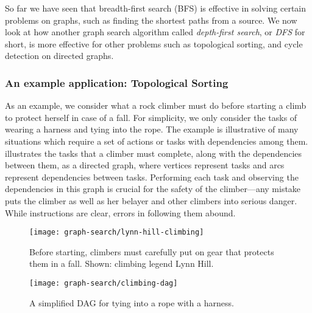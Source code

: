 \newcommand{\dfs}{\ttt{DFS}}

\newcommand{\newll}[1][]{
\ifthenelse{\equal{#1}{}}
{$\\ \makebox[\foo][r]{}$~\csep~}
{$\\ \makebox[\foo][r]{\clabel{#1}}$~\csep~}
}

So far we have seen that breadth-first search (BFS) is
effective in solving certain problems on graphs, such as finding the
shortest paths from a source.    We now look at how
another graph search algorithm called {\em depth-first search}, or
{\em DFS} for short, is more effective for other problems such as
topological sorting, and cycle detection on directed graphs.

\subsubsection{An example application: Topological Sorting}

As an example, we consider what a rock climber must do before starting
a climb to protect herself in case of a fall.  For simplicity, we only
consider the tasks of wearing a harness and tying into the rope.  The
example is illustrative of many situations which require a set of
actions or tasks with dependencies among them.
%
 illustrates the tasks that a climber must
complete, along with the dependencies between them, as a directed
graph, where vertices represent tasks and arcs represent dependencies
between tasks.
%
Performing each task and observing the dependencies in this graph is
crucial for the safety of the climber---any mistake puts the climber
as well as her belayer and other climbers into serious danger.  
%
While instructions are clear, errors in following them abound.

\begin{notesonly}
\begin{figure}
\begin{center}
\texttt{[image: graph-search/lynn-hill-climbing]}
\end{center}
\caption{Before starting, climbers must carefully put on gear that
  protects them in a fall. Shown: climbing legend Lynn Hill.}
\label{fig:dfs::rock-climbing-girl}
\end{figure}
\end{notesonly}

\begin{figure}
\begin{center}
\texttt{[image: graph-search/climbing-dag]}
\end{center}
\caption{A simplified DAG for tying into a rope with a harness.}
\label{fig:dfs::climbing-dag}
\end{figure}

